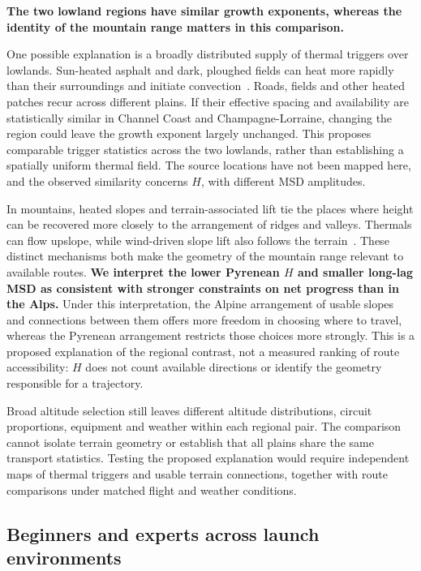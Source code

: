 \textbf{The two lowland regions have similar growth exponents, whereas the
identity of the mountain range matters in this comparison.}

One possible explanation is a broadly distributed supply of thermal triggers
over lowlands. Sun-heated asphalt and dark, ploughed fields can heat more
rapidly than their surroundings and initiate convection~\cite{ssa_lift_sources}.
Roads, fields and other heated patches recur across different plains.
If their effective spacing and availability are statistically similar in
Channel Coast and Champagne-Lorraine, changing the region could leave the
growth exponent largely unchanged. This proposes comparable trigger
statistics across the two lowlands, rather than establishing a spatially
uniform thermal field. The source locations have not been mapped here,
and the observed similarity concerns $H$, with different MSD amplitudes.

In mountains, heated slopes and terrain-associated lift tie the places where
height can be recovered more closely to the arrangement of ridges and valleys.
Thermals can flow upslope, while wind-driven slope lift also follows the
terrain~\cite[Chapter~9]{faa_glider2024}. These distinct mechanisms both make
the geometry of the mountain range relevant to available routes.
\textbf{We interpret the lower Pyrenean $H$ and smaller long-lag MSD as
consistent with stronger constraints on net progress than in the Alps.}
Under this interpretation, the Alpine arrangement of usable slopes and
connections between them offers more freedom in choosing where to travel,
whereas the Pyrenean arrangement restricts those choices more strongly.
This is a proposed explanation of the regional contrast, not a measured
ranking of route accessibility: $H$ does not count available directions or
identify the geometry responsible for a trajectory.

Broad altitude selection still leaves different altitude distributions,
circuit proportions, equipment and weather within each regional pair.
The comparison cannot isolate terrain geometry or establish that all plains
share the same transport statistics. Testing the proposed explanation would
require independent maps of thermal triggers and usable terrain connections,
together with route comparisons under matched flight and weather conditions.

\FloatBarrier
\subsection{Beginners and experts across launch environments}
\label{sec:conditional-equipment}


